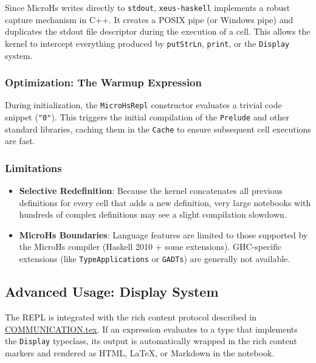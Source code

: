 Since MicroHs writes directly to \texttt{stdout}, \texttt{xeus-haskell} implements a robust capture mechanism in C++. It creates a POSIX pipe (or Windows pipe) and duplicates the stdout file descriptor during the execution of a cell. This allows the kernel to intercept everything produced by \texttt{putStrLn}, \texttt{print}, or the \texttt{Display} system.
\subsubsection{Optimization: The Warmup Expression}


During initialization, the \texttt{MicroHsRepl} constructor evaluates a trivial code snippet (\texttt{"0"}). This triggers the initial compilation of the \texttt{Prelude} and other standard libraries, caching them in the \texttt{Cache} to ensure subsequent cell executions are fast.
\subsubsection{Limitations}


\begin{itemize}
\item \textbf{Selective Redefinition}: Because the kernel concatenates all previous definitions for every cell that adds a new definition, very large notebooks with hundreds of complex definitions may see a slight compilation slowdown.
\item \textbf{MicroHs Boundaries}: Language features are limited to those supported by the MicroHs compiler (Haskell 2010 + some extensions). GHC-specific extensions (like \texttt{TypeApplications} or \texttt{GADTs}) are generally not available.
\end{itemize}


\subsection{Advanced Usage: Display System}


The REPL is integrated with the rich content protocol described in \href{./COMMUNICATION.tex}{COMMUNICATION.tex}. If an expression evaluates to a type that implements the \texttt{Display} typeclass, its output is automatically wrapped in the rich content markers and rendered as HTML, LaTeX, or Markdown in the notebook.
